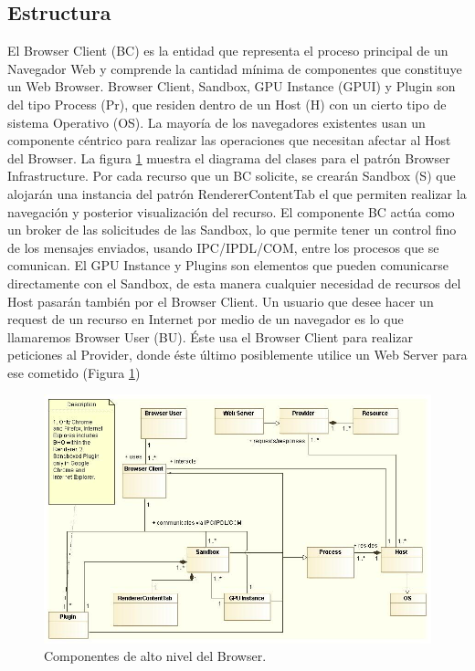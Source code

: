 \subsection{Estructura}
El Browser Client (BC) es la entidad que representa el proceso principal de un Navegador Web y comprende la cantidad mínima de componentes que constituye un Web Browser. Browser Client, Sandbox, GPU Instance (GPUI) y Plugin son del tipo Process (Pr), que residen dentro de un Host (H) con un cierto tipo de sistema Operativo (OS). La mayoría de los navegadores existentes usan un componente céntrico para realizar las operaciones que necesitan afectar al Host del Browser. La figura \ref{fig:BIPatt} muestra el diagrama del clases para el patrón Browser Infrastructure. Por cada recurso que un BC solicite, se crearán Sandbox (S) que alojarán una instancia del patrón RendererContentTab el que permiten realizar la navegación y posterior visualización del recurso.
El componente BC actúa como un broker de las solicitudes de las Sandbox, lo que permite tener un control fino de los mensajes enviados, usando IPC/IPDL/COM, entre los procesos que se comunican. El GPU Instance y Plugins son elementos que pueden comunicarse directamente con el Sandbox, de esta manera cualquier necesidad de recursos del Host pasarán también por el Browser Client. 
Un usuario que desee hacer un request de un recurso en Internet por medio de un navegador es lo que llamaremos Browser User (BU). Éste usa el Browser Client para realizar peticiones al Provider, donde éste último posiblemente utilice un Web Server para ese cometido (Figura \ref{fig:BIPatt})

	    \begin{figure}[h!t]
	        \centering
	        \includegraphics[scale=0.45]{figures/chap4/browserInfraPattern.jpg}
	        \caption{Componentes de alto nivel del Browser.}
	        \label{fig:BIPatt}
	    \end{figure}

